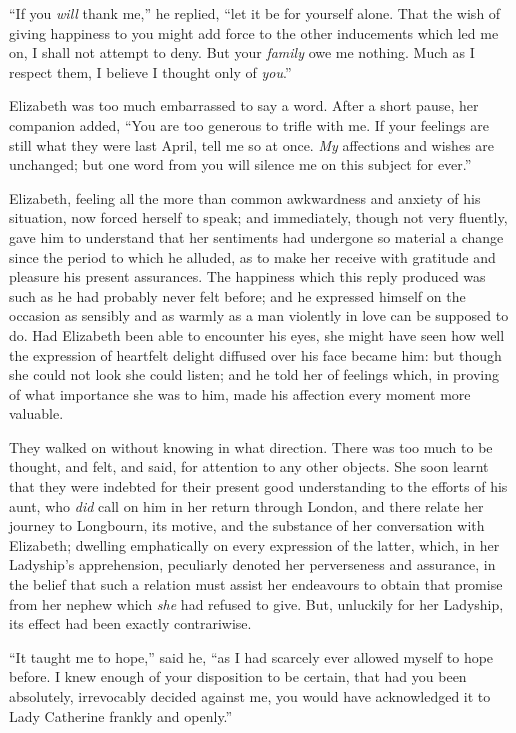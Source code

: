 \documentclass[12pt]{book}
\begin{document}
``If you \textit{will} thank me,'' he replied, ``let it be for yourself alone. That the wish of giving happiness to you might add force to the other inducements which led me on, I shall not attempt to deny. But your \textit{family} owe me nothing. Much as I respect them, I believe I thought only of \textit{you}.''

Elizabeth was too much embarrassed to say a word. After a short pause, her companion added, ``You are too generous to trifle with me. If your feelings are still what they were last April, tell me so at once. \textit{My} affections and wishes are unchanged; but one word from you will silence me on this subject for ever.''

Elizabeth, feeling all the more than common awkwardness and anxiety of his situation, now forced herself to speak; and immediately, though not very fluently, gave him to understand that her sentiments had undergone so material a change since the period to which he alluded, as to make her receive with gratitude and pleasure his present assurances. The happiness which this reply produced was such as he had probably never felt before; and he expressed himself on the occasion as sensibly and as warmly as a man violently in love can be supposed to do. Had Elizabeth been able to encounter his eyes, she might have seen how well the expression of heartfelt delight diffused over his face became him: but though she could not look she could listen; and he told her of feelings which, in proving of what importance she was to him, made his affection every moment more valuable.

They walked on without knowing in what direction. There was too much to be thought, and felt, and said, for attention to any other objects. She soon learnt that they were indebted for their present good understanding to the efforts of his aunt, who \textit{did} call on him in her return through London, and there relate her journey to Longbourn, its motive, and the substance of her conversation with Elizabeth; dwelling emphatically on every expression of the latter, which, in her Ladyship's apprehension, peculiarly denoted her perverseness and assurance, in the belief that such a relation must assist her endeavours to obtain that promise from her nephew which \textit{she} had refused to give. But, unluckily for her Ladyship, its effect had been exactly contrariwise.

``It taught me to hope,'' said he, ``as I had scarcely ever allowed myself to hope before. I knew enough of your disposition to be certain, that had you been absolutely, irrevocably decided against me, you would have acknowledged it to Lady Catherine frankly and openly.''
\end{document}
